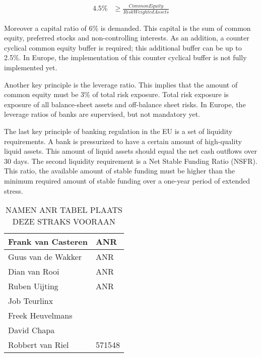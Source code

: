 \documentclass[DIV=calc, paper=a4, fontsize=11pt, twocolumn]{scrartcl}	 %
\begin{document}
 \begin{equation} \label{eq1}
\begin{split}
4.5\% & \geq \frac{Common Equity}{Risk Weighted Assets}
\end{split}
\end{equation}

Moreover a capital ratio of 6\% is demanded. This capital is the sum of common equity, preferred stocks and non-controlling interests. As an addition, a counter cyclical common equity buffer is required; this additional buffer can be up to 2.5\%. In Europe, the implementation of this counter cyclical buffer is not fully implemented yet.

Another key principle is the leverage ratio. This implies that the amount of common equity must be 3\% of total risk exposure. Total risk exposure is exposure of all balance-sheet assets and off-balance sheet risks. In Europe, the leverage ratios of banks are supervised, but not mandatory yet.

The last key principle of banking regulation in the EU is a set of liquidity requirements. A bank is pressurized to have a certain amount of high-quality liquid assets. This amount of liquid assets should equal the net cash outflows over 30 days.
The second liquidity requirement is a Net Stable Funding Ratio (NSFR). This ratio, the available amount of stable funding must be higher than the minimum required amount of stable funding over a one-year period of extended stress.

\begin{table}[]
\centering
\caption{NAMEN ANR TABEL PLAATS DEZE STRAKS VOORAAN}
\label{my-label}
\begin{tabular}{|l|l|}
\hline
Frank van Casteren & ANR  \\ \hline 
Guus van de Wakker & ANR \\ \hline
Dian van Rooi & ANR \\ \hline
Ruben Uijting & ANR \\ \hline
Job Teurlinx &  \\ \hline
Freek Heuvelmans &  \\ \hline
David Chapa &  \\ \hline
Robbert van Riel & 571548  \\ \hline
\end{tabular}
\end{table}


\begin{thebibliography}{99} %


 
\end{thebibliography}

\end{document}
